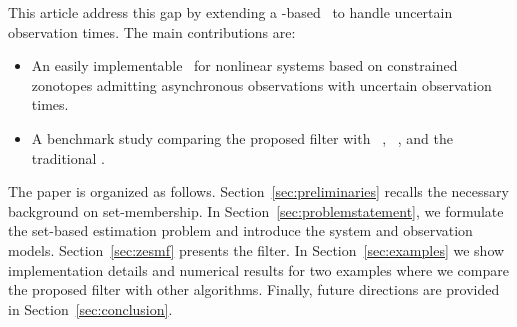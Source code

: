\documentclass{ifacconf}
\begin{document}
This article address this gap by extending a \cz-based \smf\ to handle uncertain observation times. The main contributions are:
\begin{itemize}
  \item An easily implementable \smf\ for nonlinear systems based on constrained zonotopes admitting asynchronous observations with uncertain observation times.%
  \item A benchmark study comparing the proposed filter with \iesmfshort~\citep{Bolting2018b}, \vsivialong\ \citep{herrero2012efficient}, and the traditional \ekf.
\end{itemize}

The paper is organized as follows.
Section~\ref{sec:preliminaries} recalls the necessary background on set-membership.
In Section~\ref{sec:problemstatement}, we formulate the set-based estimation problem and introduce the system and observation models.
Section~\ref{sec:zesmf} presents the filter.
In Section~\ref{sec:examples} we show implementation details and numerical results for two examples where we compare the proposed filter with other algorithms. Finally, future directions are provided in Section~\ref{sec:conclusion}.
%
%
%
%
\end{document}
